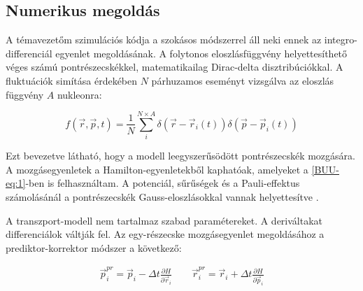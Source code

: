 \documentclass[a4paper,12pt]{article}
\begin{document}
\vspace{5mm}

\subsection{ Numerikus megoldás}

\vspace{5mm}

\par A témavezetőm szimulációs kódja \cite{wolf3, wolf2} a szokásos módszerrel áll neki ennek az integro-differenciál egyenlet megoldásának. A folytonos eloszlásfüggvény helyettesíthető véges számú pontrészecskékkel, matematikailag Dirac-delta disztribúciókkal. A fluktuációk simítása érdekében $N$ párhuzamos eseményt vizsgálva az eloszlás függvény $A$ nukleonra:

\vspace{5mm}

\begin{equation}
	f(\vec{r}, \vec{p}, t) = \frac{1}{N}\sum_{i}^{N \times A} \delta(\vec{r} - \vec{r}_{i}(t))\delta(\vec{p} - \vec{p}_{i}(t))
\end{equation}

\vspace{5mm}

\par Ezt bevezetve látható, hogy a modell leegyszerűsödött pontrészecskék mozgására. A mozgásegyenletek a Hamilton-egyenletekből kaphatóak, amelyeket a \eqref{BUU-eq:1}-ben is felhasználtam. A potenciál, sűrűségek és a Pauli-effektus számolásánál a pontrészecskék Gauss-eloszlásokkal vannak helyettesítve \cite{wolfDSC}.

\vspace{5mm}

\par A transzport-modell nem tartalmaz szabad paramétereket. A deriváltakat differenciálok váltják fel. Az egy-részecske mozgásegyenlet megoldásához a prediktor-korrektor módszer a következő:

\vspace{5mm}

\begin{gather}
	\vec{p}^{pr}_{i} = \vec{p}_{i} - \Delta t \frac{\partial H}{\partial \vec{r}_{i}} \quad \quad \vec{r}^{pr}_{i} = \vec{r}_{i} + \Delta t \frac{\partial H}{\partial \vec{p}_{i}}
\end{gather}

\vspace{5mm}
\end{document}
